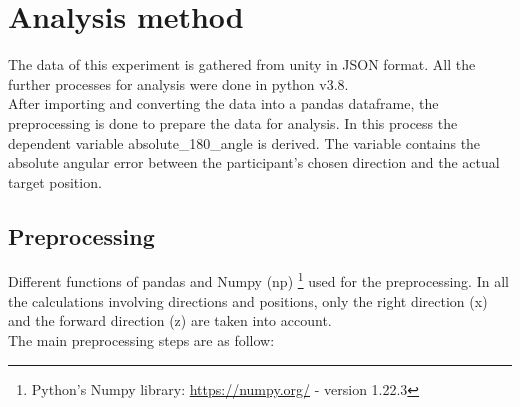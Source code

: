 

\section{Analysis method}

The data of this experiment is gathered from unity in JSON format. All the further processes for analysis were done in python \autocite{10.5555/1593511} v3.8. \\
After importing and converting the data into a pandas \autocite{reback2022pandas, mckinney-proc-scipy-2010} dataframe, the preprocessing is done to prepare the data for analysis. In this process the dependent variable {\emphasize absolute\_180\_angle} is derived. The variable contains the absolute angular error between the participant's chosen direction and the actual target position. 

\subsection{Preprocessing}

Different functions of pandas and Numpy {\emphasize (np)} \footnote{Python's Numpy library: \href{https://numpy.org/}{https://numpy.org/} - version 1.22.3} used for the preprocessing. In all the calculations involving directions and positions, only the right direction (x) and the forward direction (z) are taken into account. \\
The main preprocessing steps are as follow:

